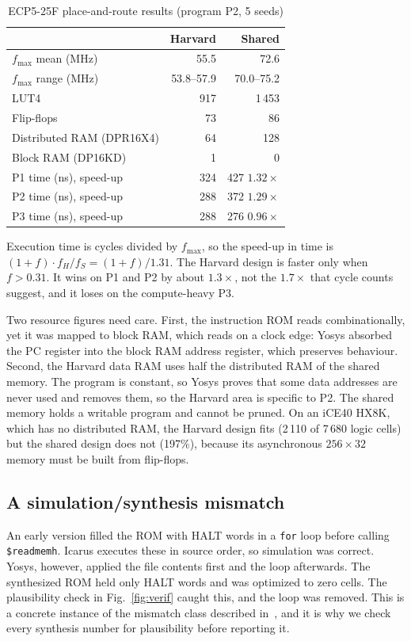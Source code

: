 \documentclass[conference]{IEEEtran}
\newcommand{\sig}[1]{\texttt{\small #1}}
\begin{document}
\begin{table}[!t]
\caption{ECP5-25F place-and-route results (program P2, 5 seeds)}
\label{tab:fpga}
\centering
\begin{tabular}{@{}lrr@{}}
\toprule
 & Harvard & Shared \\
\midrule
$f_\text{max}$ mean (MHz)        & 55.5 & 72.6 \\
$f_\text{max}$ range (MHz)       & 53.8--57.9 & 70.0--75.2 \\
LUT4                             & 917 & 1\,453 \\
Flip-flops                       & 73 & 86 \\
Distributed RAM (DPR16X4)        & 64 & 128 \\
Block RAM (DP16KD)               & 1 & 0 \\
\midrule
P1 time (ns), speed-up           & 324 & 427 \quad $1.32\times$ \\
P2 time (ns), speed-up           & 288 & 372 \quad $1.29\times$ \\
P3 time (ns), speed-up           & 288 & 276 \quad $0.96\times$ \\
\bottomrule
\end{tabular}
\end{table}

Execution time is cycles divided by $f_\text{max}$, so the speed-up in time is $(1+f)\cdot f_H/f_S = (1+f)/1.31$. The Harvard design is faster only when $f>0.31$. It wins on P1 and P2 by about $1.3\times$, not the $1.7\times$ that cycle counts suggest, and it loses on the compute-heavy P3.

Two resource figures need care. First, the instruction ROM reads combinationally, yet it was mapped to block RAM, which reads on a clock edge: Yosys absorbed the PC register into the block RAM address register, which preserves behaviour. Second, the Harvard data RAM uses half the distributed RAM of the shared memory. The program is constant, so Yosys proves that some data addresses are never used and removes them, so the Harvard area is specific to P2. The shared memory holds a writable program and cannot be pruned. On an iCE40 HX8K, which has no distributed RAM, the Harvard design fits (2\,110 of 7\,680 logic cells) but the shared design does not (197\%), because its asynchronous $256\times32$ memory must be built from flip-flops.

\subsection{A simulation/synthesis mismatch}\label{sec:mismatch}
An early version filled the ROM with HALT words in a \texttt{for} loop before calling \sig{\$readmemh}. Icarus executes these in source order, so simulation was correct. Yosys, however, applied the file contents first and the loop afterwards. The synthesized ROM held only HALT words and was optimized to zero cells. The plausibility check in Fig.~\ref{fig:verif} caught this, and the loop was removed. This is a concrete instance of the mismatch class described in~\cite{mills}, and it is why we check every synthesis number for plausibility before reporting it.
\end{document}
